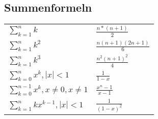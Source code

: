 \subsection{Summenformeln}
\begin{tabular}{ll}
    $ \sum_{k=1}^n k $ & $ \frac{n * (n+1)}{2} $ \\
    $ \sum_{k=1}^n k^2 $ & $ \frac{n(n + 1)(2n + 1)}{6} $ \\
    $ \sum_{k=1}^n k^3 $ & $ \frac{n^2(n+1)^2}{4} $ \\
    $ \sum_{k=0}^n x^k, |x| < 1 $ & $\frac{1}{1 -x} $ \\
    $ \sum_{k=0}^{n-1} x^k, x \neq 0, x \neq 1  $ & $  \frac{x^n - 1}{x - 1} $ \\
    $ \sum_{k=1}^n kx^{k-1}, |x| < 1 $ & $ \frac{1}{(1-x)^2} $ \\
\end{tabular} 

